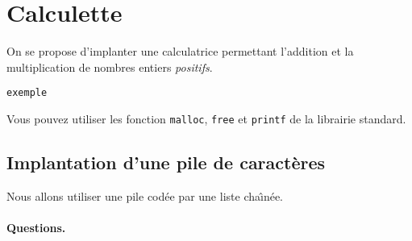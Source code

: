 \section{Calculette}
On se propose d'implanter une calculatrice permettant l'addition et la
multiplication de nombres entiers \emph{positifs}.
\begin{verbatim}
exemple
\end{verbatim}
Vous pouvez utiliser les fonction \verb+malloc+, \verb+free+
et \verb+printf+ de la librairie standard.
\subsection{Implantation d'une pile de caract\`eres}
 Nous allons utiliser une pile cod\'ee par une liste cha\^\i{}n\'ee.
\paragraph{Questions.}

